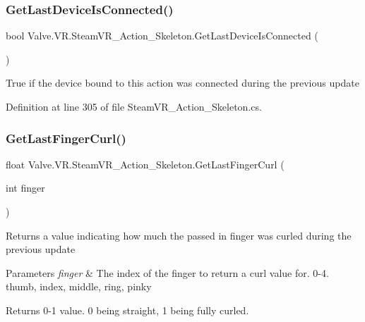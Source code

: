 \subsubsection{\texorpdfstring{GetLastDeviceIsConnected()}{GetLastDeviceIsConnected()}}
{\footnotesize\ttfamily bool Valve.\+V\+R.\+Steam\+V\+R\+\_\+\+Action\+\_\+\+Skeleton.\+Get\+Last\+Device\+Is\+Connected (\begin{DoxyParamCaption}{ }\end{DoxyParamCaption})}



True if the device bound to this action was connected during the previous update 



Definition at line 305 of file Steam\+V\+R\+\_\+\+Action\+\_\+\+Skeleton.\+cs.

\mbox{\label{class_valve_1_1_v_r_1_1_steam_v_r___action___skeleton_aee762f7204379e759e9667fa492eb2ca}} 
\subsubsection{\texorpdfstring{GetLastFingerCurl()}{GetLastFingerCurl()}\hspace{0.1cm}{\footnotesize\ttfamily [1/2]}}
{\footnotesize\ttfamily float Valve.\+V\+R.\+Steam\+V\+R\+\_\+\+Action\+\_\+\+Skeleton.\+Get\+Last\+Finger\+Curl (\begin{DoxyParamCaption}\item[{int}]{finger }\end{DoxyParamCaption})}



Returns a value indicating how much the passed in finger was curled during the previous update 


\begin{DoxyParams}{Parameters}
{\em finger} & The index of the finger to return a curl value for. 0-\/4. thumb, index, middle, ring, pinky\\
\hline
\end{DoxyParams}
\begin{DoxyReturn}{Returns}
0-\/1 value. 0 being straight, 1 being fully curled.
\end{DoxyReturn}


